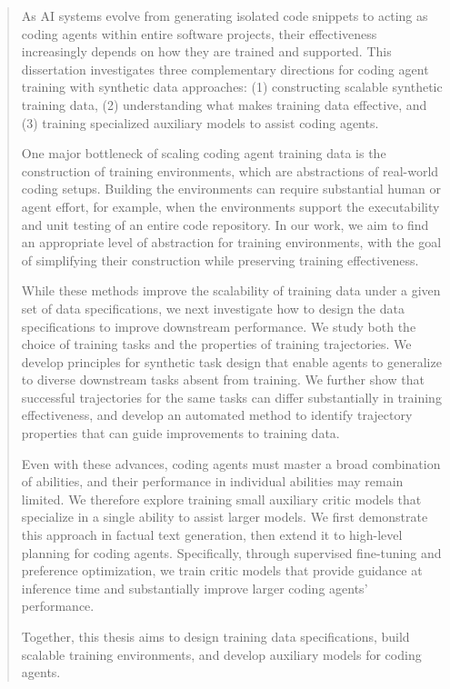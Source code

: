 \documentclass[12pt,openany]{cmuthesis}
\begin{document}
\begin{abstract}
As AI systems evolve from generating isolated code snippets to acting as coding agents within entire software projects, their effectiveness increasingly depends on how they are trained and supported. 
This dissertation investigates three complementary directions for coding agent training with synthetic data approaches: (1) constructing scalable synthetic training data, (2) understanding what makes training data effective, and (3) training specialized auxiliary models to assist coding agents.

One major bottleneck of scaling coding agent training data is the construction of training environments, which are abstractions of real-world coding setups.
Building the environments can require substantial human or agent effort, for example, when the environments support the executability and unit testing of an entire code repository. 
In our work, we aim to find an appropriate level of abstraction for training environments, with the goal of simplifying their construction while preserving training effectiveness.

While these methods improve the scalability of training data under a given set of data specifications, we next investigate how to design the data specifications to improve downstream performance. 
We study both the choice of training tasks and the properties of training trajectories. We develop principles for synthetic task design that enable agents to generalize to diverse downstream tasks absent from training. We further show that successful trajectories for the same tasks can differ substantially in training effectiveness, and develop an automated method to identify trajectory properties that can guide improvements to training data.

Even with these advances, coding agents must master a broad combination of abilities, and their performance in individual abilities may remain limited. We therefore explore training small auxiliary critic models that specialize in a single ability to assist larger models. We first demonstrate this approach in factual text generation, then extend it to high-level planning for coding agents. Specifically, through supervised fine-tuning and preference optimization, we train critic models that provide guidance at inference time and substantially improve larger coding agents’ performance.

Together, this thesis aims to design training data specifications, build scalable training environments, and develop auxiliary models for coding agents.
\end{abstract}
\end{document}
